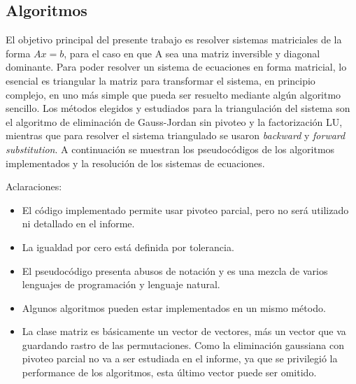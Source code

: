 \subsection{Algoritmos}

El objetivo principal del presente trabajo es resolver sistemas matriciales de la forma $Ax = b$, para el caso en que A sea una matriz inversible y diagonal dominante. Para poder resolver un sistema de ecuaciones en forma matricial, lo esencial es triangular la matriz para transformar el sistema, en principio complejo, en uno más simple que pueda ser resuelto mediante algún algoritmo sencillo.
Los métodos elegidos y estudiados para la triangulación del sistema son el algoritmo de eliminación de Gauss-Jordan sin pivoteo y la factorización LU, mientras que para resolver el sistema triangulado se usaron \emph{backward} y \emph{forward} \emph{substitution}. A continuación se muestran los pseudocódigos de los algoritmos implementados y la resolución de los sistemas de ecuaciones.



Aclaraciones:
\begin{itemize}
\item El código implementado permite usar pivoteo parcial, pero no será utilizado ni detallado en el informe.
\item La igualdad por cero está definida por tolerancia.
\item El pseudocódigo presenta abusos de notación y es una mezcla de varios lenguajes de programación y lenguaje natural.
\item Algunos algoritmos pueden estar implementados en un mismo método.
\item La clase matriz es básicamente un vector de vectores, más un vector que va guardando rastro de las permutaciones. Como la eliminación gaussiana con pivoteo parcial no va a ser estudiada en el informe, ya que se privilegió la performance de los algoritmos, esta último vector puede ser omitido.
\end{itemize}







